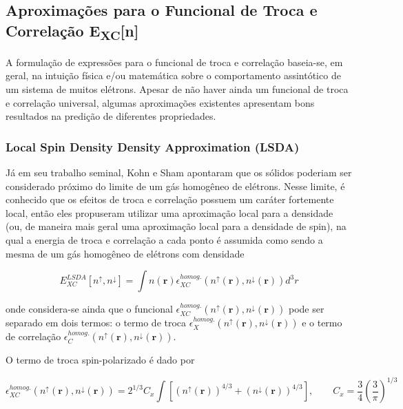 	
	\subsection{Aproximações para o Funcional de Troca e Correlação E\textsubscript{XC}[n]}
	
		A formulação de expressões para o funcional de troca e correlação baseia-se, em geral, na intuição física e/ou matemática sobre o comportamento assintótico de um sistema de muitos elétrons. Apesar de não haver ainda um funcional de troca e correlação universal, algumas aproximações existentes apresentam bons resultados na predição de diferentes propriedades. 
	
		\subsubsection{Local Spin Density Density Approximation (LSDA)}
		
			Já em seu trabalho seminal, Kohn e Sham apontaram que os sólidos poderiam ser considerado próximo do limite de um gás homogêneo de elétrons. Nesse limite, é conhecido que os efeitos de troca e correlação possuem um caráter fortemente local, então eles propuseram utilizar uma aproximação local para a densidade (ou, de maneira mais geral uma aproximação local para a densidade de spin), na qual a energia de troca e correlação a cada ponto é assumida como sendo a mesma de um gás homogêneo de elétrons com densidade
			
			\begin{equation}
				E_{XC}^{LSDA}[n^\uparrow, n^\downarrow] = \int n(\textbf{r})\epsilon_{XC}^{homog.}(n^\uparrow(\textbf{r}), n^\downarrow(\textbf{r})) d^3r
			\end{equation}
			
			onde considera-se ainda que o funcional $\epsilon_{XC}^{homog.}(n^\uparrow(\textbf{r}), n^\downarrow(\textbf{r}))$ pode ser separado em dois termos: o termo de troca $\epsilon_{X}^{homog.}(n^\uparrow(\textbf{r}), n^\downarrow(\textbf{r}))$ e o termo de correlação $\epsilon_{C}^{homog.}(n^\uparrow(\textbf{r}), n^\downarrow(\textbf{r}))$. 
			
			O termo de troca spin-polarizado é dado por
			
			\begin{equation}
			\epsilon_{XC}^{homog.}(n^\uparrow(\textbf{r}), n^\downarrow(\textbf{r})) = 2^{1/3}C_x\int\left[ (n^\uparrow(\textbf{r}))^{4/3} + (n^\downarrow(\textbf{r}))^{4/3} \right] , \qquad C_x = \frac{3}{4}\left(\frac{3}{\pi} \right)^{1/3}
			\end{equation}
						
